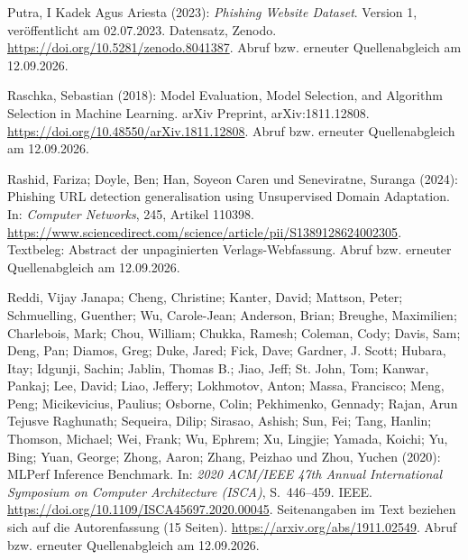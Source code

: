 \par\smallskip
\begin{samepage}
\noindent
Putra, I Kadek Agus Ariesta (2023):
\textit{Phishing Website Dataset}. Version 1, veröffentlicht am 02.07.2023.
Datensatz, Zenodo. \url{https://doi.org/10.5281/zenodo.8041387}.
Abruf bzw. erneuter Quellenabgleich am 12.09.2026.
\par\end{samepage}
\par\smallskip
\begin{samepage}
\noindent
Raschka, Sebastian (2018):
Model Evaluation, Model Selection, and Algorithm Selection in Machine Learning.
arXiv Preprint, arXiv:1811.12808.
\url{https://doi.org/10.48550/arXiv.1811.12808}.
Abruf bzw. erneuter Quellenabgleich am 12.09.2026.
\par\end{samepage}
\par\smallskip
\begin{samepage}
\noindent
Rashid, Fariza; Doyle, Ben; Han, Soyeon Caren und Seneviratne, Suranga (2024):
Phishing URL detection generalisation using Unsupervised Domain Adaptation.
In: \textit{Computer Networks}, 245, Artikel 110398.
\url{https://www.sciencedirect.com/science/article/pii/S1389128624002305}.
Textbeleg: Abstract der unpaginierten Verlags-Webfassung.
Abruf bzw. erneuter Quellenabgleich am 12.09.2026.
\par\end{samepage}
\par\smallskip
\begin{samepage}
\noindent
Reddi, Vijay Janapa; Cheng, Christine; Kanter, David; Mattson, Peter;
Schmuelling, Guenther; Wu, Carole-Jean; Anderson, Brian; Breughe, Maximilien;
Charlebois, Mark; Chou, William; Chukka, Ramesh; Coleman, Cody; Davis, Sam;
Deng, Pan; Diamos, Greg; Duke, Jared; Fick, Dave; Gardner, J. Scott;
Hubara, Itay; Idgunji, Sachin; Jablin, Thomas B.; Jiao, Jeff;
St. John, Tom; Kanwar, Pankaj; Lee, David; Liao, Jeffery; Lokhmotov, Anton;
Massa, Francisco; Meng, Peng; Micikevicius, Paulius; Osborne, Colin;
Pekhimenko, Gennady; Rajan, Arun Tejusve Raghunath; Sequeira, Dilip;
Sirasao, Ashish; Sun, Fei; Tang, Hanlin; Thomson, Michael; Wei, Frank;
Wu, Ephrem; Xu, Lingjie; Yamada, Koichi; Yu, Bing; Yuan, George;
Zhong, Aaron; Zhang, Peizhao und Zhou, Yuchen (2020):
MLPerf Inference Benchmark.
In: \textit{2020 ACM/IEEE 47th Annual International Symposium on Computer Architecture (ISCA)},
S.~446--459.
IEEE.
\url{https://doi.org/10.1109/ISCA45697.2020.00045}.
Seitenangaben im Text beziehen sich auf die Autorenfassung (15 Seiten). \url{https://arxiv.org/abs/1911.02549}.
Abruf bzw. erneuter Quellenabgleich am 12.09.2026.
\par\end{samepage}
